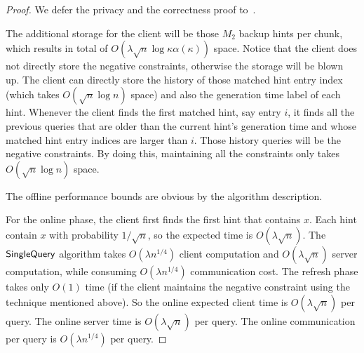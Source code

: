 \begin{proof}
    We defer the privacy and the correctness proof to~.
    
    The additional storage for the client will be those $M_2$ backup hints per
    chunk, which results in total of $O(\lambda\sqrt{n}\log \kappa
    \alpha(\kappa))$ space. Notice that the client does not directly store the
    negative constraints, otherwise the storage will be blown up. The client can
    directly store the history of those matched hint entry index (which takes
    $O(\sqrt{n}\log n)$ space) and also the generation time label of each hint.
    Whenever the client finds the first matched hint, say entry $i$, it finds
    all the previous queries that are older than the current hint's generation
    time and whose matched hint entry indices are larger than $i$. Those history
    queries will be the negative constraints. By doing this, maintaining all the
    constraints only takes $O(\sqrt{n}\log n)$ space.
    
    
    The offline performance bounds are obvious by the algorithm description.
    
    For the online phase, the client first finds the first hint that contains
    $x$. Each hint contain $x$ with probability $1/\sqrt{n}$, so the expected
    time is $O(\lambda\sqrt{n})$. The $\mathsf{SingleQuery}$ algorithm takes $O(\lambda
    n^{1/4})$ client computation and $O(\lambda \sqrt{n})$ server computation,
    while consuming $O(\lambda n^{1/4})$ communication cost. The refresh phase
    takes only $O(1)$ time (if the client maintains the negative constraint
    using the technique mentioned above). So the online expected client time is
    $O(\lambda\sqrt{n})$ per query. The online server time is
    $O(\lambda\sqrt{n})$ per query. The online communication per query is
    $O(\lambda n^{1/4})$ per query.
\end{proof}

